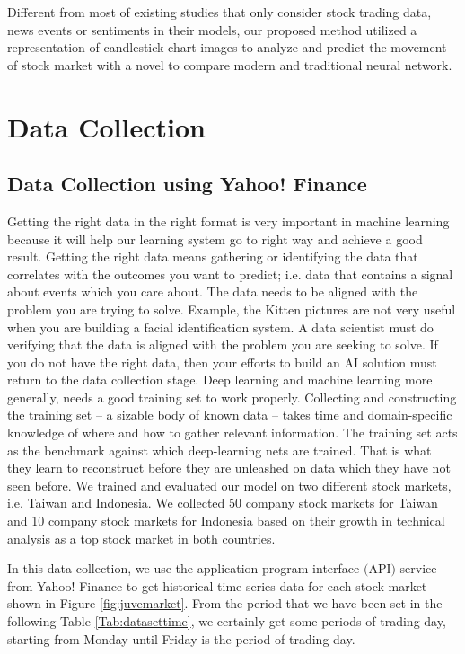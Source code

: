 \documentclass[10pt,twocolumn]{article}
\begin{document}
\par
Different from most of existing studies that only consider stock trading data, news events or sentiments in their models, our proposed method utilized a representation of candlestick chart images to analyze and predict the movement of stock market with a novel to compare modern and traditional neural network. 


\section{Data Collection}
\subsection{Data Collection using Yahoo! Finance}
Getting the right data in the right format is very important in machine learning because it will help our learning system go to right way and achieve a good result. Getting the right data means gathering or identifying the data that correlates with the outcomes you want to predict; i.e. data that contains a signal about events which you care about. The data needs to be aligned with the problem you are trying to solve. Example, the Kitten pictures are not very useful when you are building a facial identification system. A data scientist must do verifying that the data is aligned with the problem you are seeking to solve. If you do not have the right data, then your efforts to build an AI solution must return to the data collection stage.
Deep learning and machine learning more generally, needs a good training set to work properly. Collecting and constructing the training set – a sizable body of known data – takes time and domain-specific knowledge of where and how to gather relevant information. The training set acts as the benchmark against which deep-learning nets are trained. That is what they learn to reconstruct before they are unleashed on data which they have not seen before.
We trained and evaluated our model on two different stock markets, i.e. Taiwan and Indonesia. We collected 50 company stock markets for Taiwan and 10 company stock markets for Indonesia based on their growth in technical analysis as a top stock market in both countries.
\par
In this data collection, we use the application program interface $($API$)$ service from Yahoo! Finance to get historical time series data for each stock market shown in Figure \ref{fig:juvemarket}. From the period that we have been set in the following Table \ref{Tab:datasettime}, we certainly get some periods of trading day, starting from Monday until Friday is the period of trading day.
\end{document}
